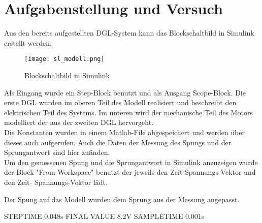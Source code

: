 \section{Aufgabenstellung und Versuch}

Aus den bereits aufgestellten DGL-System kann das Blockschaltbild in Simulink
erstellt werden.

\begin{figure}[H]
    \centering
    \texttt{[image: sl\_modell.png]}
    \caption{Blockschaltbild in Simulink}
    \label{fig:Blockschaltbild}
\end{figure}

Als Eingang wurde ein Step-Block benutzt und als Ausgang Scope-Block.
Die erste DGL wurden im oberen Teil des Modell realisiert und beschreibt
den elektrischen Teil des Systems. Im unteren wird der mechanische Teil
des Motors modelliert der aus der zweiten DGL hervorgeht.\\

Die Konstanten wurden in einem Matlab-File abgespeichert und werden über
dieses auch aufgerufen. Auch die Daten der Messung des Spungs und der
Sprungantwort sind hier zufinden.\\

Um den gemessenen Spung und die Sprungantwort in Simulink anzuzeigen wurde der Block
"From Workspace" benutzt der jeweils den Zeit-Spannungs-Vektor und den Zeit-
Spannungs-Vektor lädt.

Der Spung auf das Modell wurden dem Sprung aus der Messung angepasst.

STEPTIME 0.048s
FINAL VALUE 8.2V
SAMPLETIME 0.001s

